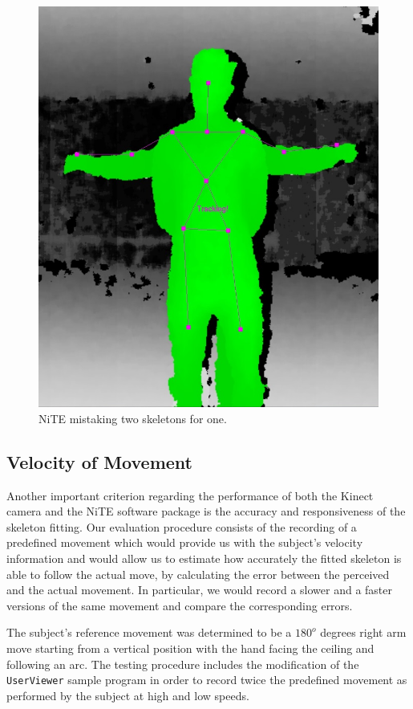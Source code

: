 \documentclass[a4paper]{article}
\begin{document}
\begin{figure}[H]
\center
\includegraphics[scale=0.2]{Occlusion2.jpg} 
\caption{NiTE mistaking two skeletons for one.}
\label{occlusion3}
\end{figure} 

\subsection{Velocity of Movement}
Another important criterion regarding the performance of both the Kinect camera and the NiTE software package is the accuracy and responsiveness of the skeleton fitting. Our evaluation procedure consists of the recording of a predefined movement which would provide us with the subject's velocity information and would allow us to estimate how accurately the fitted skeleton is able to follow the actual move, by calculating the error between the perceived and the actual movement. In particular, we would record a slower and a faster versions of the same movement and compare the corresponding errors.

The subject's reference movement was determined to be a $180^o$ degrees right arm move starting from a vertical position with the hand facing the ceiling and following an arc. The testing procedure includes the modification of the \texttt{UserViewer} sample program in order to record twice the predefined movement as performed by the subject at high and low speeds. 
\end{document}
